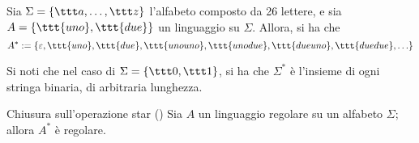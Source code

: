 \documentclass[a4paper, 12pt]{report}
\begin{document}
    \begin{example}[Star]
        Sia $\Sigma = \{\ttt a , \ldots, \ttt z\}$ l'alfabeto composto da 26 lettere, e sia $A = \{\ttt{uno}, \ttt{due}\}$ un linguaggio su $\Sigma$. Allora, si ha che $$A^* := \{\varepsilon, \ttt{uno}, \ttt{due}, \ttt{unouno}, \ttt{unodue}, \ttt{dueuno}, \ttt{duedue}, \ldots\}$$
    \end{example}
   
    \begin{example}
        Si noti che nel caso di $\Sigma = \{ \ttt 0, \ttt 1 \}$, si ha che $\Sigma^*$ è l'insieme di ogni stringa binaria, di arbitraria lunghezza.
    \end{example}

    \begin{framedprop}[label={closure star}]{Chiusura sull'operazione star (\REG)}
        Sia $A$ un linguaggio regolare su un alfabeto $\Sigma$; allora $A^*$ è regolare.
    \end{framedprop}
\end{document}
